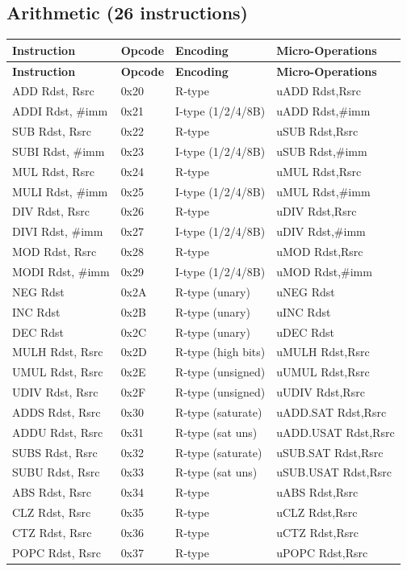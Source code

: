 \documentclass[12pt]{article}
\begin{document}
\subsection{Arithmetic (26 instructions)}

\begin{longtable}{@{}L{3cm}L{1.5cm}L{1.8cm}L{4.8cm}@{}}
\toprule
\textbf{Instruction} & \textbf{Opcode} & \textbf{Encoding} & \textbf{Micro-Operations} \\ \midrule
\endfirsthead
\toprule
\textbf{Instruction} & \textbf{Opcode} & \textbf{Encoding} & \textbf{Micro-Operations} \\ \midrule
\endhead
ADD Rdst, Rsrc & 0x20 & R-type & uADD Rdst,Rsrc \\
ADDI Rdst, \#imm & 0x21 & I-type (1/2/4/8B) & uADD Rdst,\#imm \\
SUB Rdst, Rsrc & 0x22 & R-type & uSUB Rdst,Rsrc \\
SUBI Rdst, \#imm & 0x23 & I-type (1/2/4/8B) & uSUB Rdst,\#imm \\
MUL Rdst, Rsrc & 0x24 & R-type & uMUL Rdst,Rsrc \\
MULI Rdst, \#imm & 0x25 & I-type (1/2/4/8B) & uMUL Rdst,\#imm \\
DIV Rdst, Rsrc & 0x26 & R-type & uDIV Rdst,Rsrc \\
DIVI Rdst, \#imm & 0x27 & I-type (1/2/4/8B) & uDIV Rdst,\#imm \\
MOD Rdst, Rsrc & 0x28 & R-type & uMOD Rdst,Rsrc \\
MODI Rdst, \#imm & 0x29 & I-type (1/2/4/8B) & uMOD Rdst,\#imm \\
NEG Rdst & 0x2A & R-type (unary) & uNEG Rdst \\
INC Rdst & 0x2B & R-type (unary) & uINC Rdst \\
DEC Rdst & 0x2C & R-type (unary) & uDEC Rdst \\
MULH Rdst, Rsrc & 0x2D & R-type (high bits) & uMULH Rdst,Rsrc \\
UMUL Rdst, Rsrc & 0x2E & R-type (unsigned) & uUMUL Rdst,Rsrc \\
UDIV Rdst, Rsrc & 0x2F & R-type (unsigned) & uUDIV Rdst,Rsrc \\
ADDS Rdst, Rsrc & 0x30 & R-type (saturate) & uADD.SAT Rdst,Rsrc \\
ADDU Rdst, Rsrc & 0x31 & R-type (sat uns) & uADD.USAT Rdst,Rsrc \\
SUBS Rdst, Rsrc & 0x32 & R-type (saturate) & uSUB.SAT Rdst,Rsrc \\
SUBU Rdst, Rsrc & 0x33 & R-type (sat uns) & uSUB.USAT Rdst,Rsrc \\
ABS Rdst, Rsrc & 0x34 & R-type & uABS Rdst,Rsrc \\
CLZ Rdst, Rsrc & 0x35 & R-type & uCLZ Rdst,Rsrc \\
CTZ Rdst, Rsrc & 0x36 & R-type & uCTZ Rdst,Rsrc \\
POPC Rdst, Rsrc & 0x37 & R-type & uPOPC Rdst,Rsrc \\ \bottomrule
\end{longtable}
\end{document}
